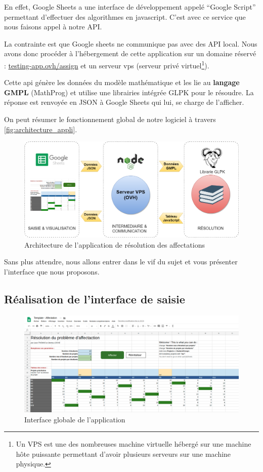 \documentclass[final,poster]{polytech/polytech}
\begin{document}
En effet, Google Sheets a une interface de développement appelé “Google Script” permettant d’effectuer des algorithmes en javascript.
C'est avec ce service que nous faisons appel à notre API.

La contrainte est que Google sheets ne communique pas avec des API local. Nous avons donc procéder à l'hébergement de cette application sur un domaine réservé : \url{testing-app.ovh/assign} et un serveur vps (serveur privé virtuel\footnote{Un VPS est une des nombreuses machine virtuelle hébergé sur une machine hôte puissante permettant d'avoir plusieurs serveurs sur une machine physique.}).

Cette api génère les données du modèle mathématique et les lie au \textbf{langage GMPL} (MathProg) et utilise une librairies intégrée GLPK pour le résoudre. 
La réponse est renvoyée en JSON à Google Sheets qui lui, se charge de l’afficher.

On peut résumer le fonctionnement global de notre logiciel à travers \autoref{fig:architecture_appli}.

\begin{figure}[htbp]
\includegraphics[width=15cm]{images/architecture_appli}
\caption{\label{fig:architecture_appli} Architecture de l'application de résolution des affectations}
\end{figure}

Sans plus attendre, nous allons entrer dans le vif du sujet et vous présenter l'interface que nous proposons.

\subsection{Réalisation de l'interface de saisie}

\begin{figure}
\includegraphics[width=15cm]{images/interface_appli_globale}
\caption{\label{fig:appli_interface_globale} Interface globale de l'application}
\end{figure}
\end{document}
